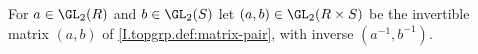 For $a\in\GL_2(R)$ and $b\in\GL_2(S)$ let $(a,b)\in\GL_2(R\times S)$ be the invertible matrix $(a,b)$ of \cref{I.topgrp.def:matrix-pair}, with inverse $(a^{-1},b^{-1})$.
